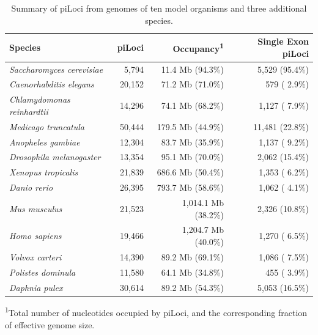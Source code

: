 \begin{table}[t]
\caption{Summary of piLoci from genomes of ten model organisms and three additional species.}
\label{Table:piLocusSingleGeneFraction}
\begin{tabularx}{\textwidth}{lrrr}
\hline
                            Species &               piLoci &  Occupancy\textsuperscript{1} &   Single Exon piLoci  \\ \hline
\textit{Saccharomyces cerevisiae}   &                5,794 &              11.4 Mb (94.3\%) &       5,529 (95.4\%)  \\
\textit{Caenorhabditis elegans}     &               20,152 &              71.2 Mb (71.0\%) &         579 ( 2.9\%)  \\
\textit{Chlamydomonas reinhardtii}  &               14,296 &              74.1 Mb (68.2\%) &       1,127 ( 7.9\%)  \\
\textit{Medicago truncatula}        &               50,444 &             179.5 Mb (44.9\%) &      11,481 (22.8\%)  \\
\textit{Anopheles gambiae}          &               12,304 &              83.7 Mb (35.9\%) &       1,137 ( 9.2\%)  \\
\textit{Drosophila melanogaster}    &               13,354 &              95.1 Mb (70.0\%) &       2,062 (15.4\%)  \\
\textit{Xenopus tropicalis}         &               21,839 &             686.6 Mb (50.4\%) &       1,353 ( 6.2\%)  \\
\textit{Danio rerio}                &               26,395 &             793.7 Mb (58.6\%) &       1,062 ( 4.1\%)  \\
\textit{Mus musculus}               &               21,523 &           1,014.1 Mb (38.2\%) &       2,326 (10.8\%)  \\
\textit{Homo sapiens}               &               19,466 &           1,204.7 Mb (40.0\%) &       1,270 ( 6.5\%)  \\ \hline
\textit{Volvox carteri}             &               14,390 &              89.2 Mb (69.1\%) &       1,086 ( 7.5\%)  \\
\textit{Polistes dominula}          &               11,580 &              64.1 Mb (34.8\%) &         455 ( 3.9\%)  \\
\textit{Daphnia pulex}              &               30,614 &              89.2 Mb (54.3\%) &       5,053 (16.5\%)  \\ \hline
\end{tabularx}
\raggedright
{\scriptsize
\textsuperscript{1}Total number of nucleotides occupied by piLoci, and the corresponding fraction of effective genome size.
}
\end{table}

